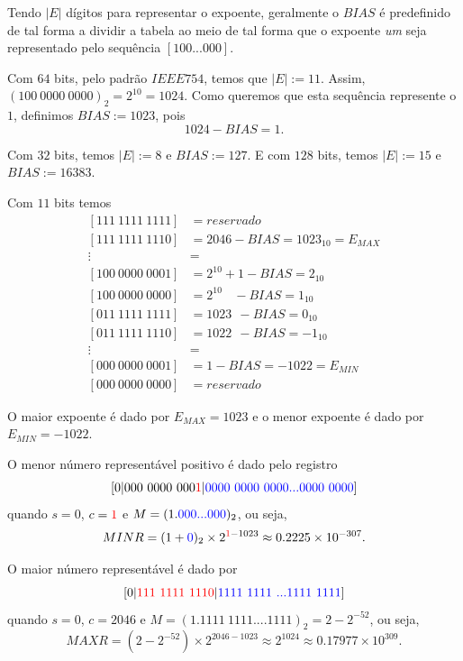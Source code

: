 Tendo $|E|$ dígitos para representar o expoente, geralmente o $BIAS$ é predefinido de tal forma a dividir a tabela ao meio de tal forma que o expoente \textit{um} seja representado pelo sequência $[100...000]$. 

\begin{ex}
Com $64$ bits, pelo padrão $IEEE754$, temos que $|E|:=11$. Assim, $(100~0000~0000)_2=2^{10}=1024$. Como queremos que esta sequência represente o $1$, definimos $BIAS:=1023$, pois
$$ 1024-BIAS=1.$$

Com $32$ bits, temos $|E|:=8$ e $BIAS:=127$. E com $128$ bits, temos $|E|:=15$ e $BIAS:=16383$.
\end{ex}


Com $11$ bits temos 
\begin{equation*}
  \begin{split}
 [111~1111~1111] &= reservado\\
 [111~1111~1110] &= 2046-BIAS      = 1023_{10}= E_{MAX}\\
     \vdots      &=  \\
 [100~0000~0001] &= 2^{10}+1  -BIAS =  2_{10} \\
 [100~0000~0000] &= 2^{10}~~~~-BIAS =  1_{10} \\
 [011~1111~1111] &= 1023   ~~ -BIAS =  0_{10} \\
 [011~1111~1110] &= 1022   ~~ -BIAS = -1_{10} \\
     \vdots      &=  \\
 [000~0000~0001] &= 1-BIAS = -1022 = E_{MIN}\\
 [000~0000~0000] &= reservado    
  \end{split}
\end{equation*}

O maior expoente é dado por $E_{MAX}=1023$ e o menor expoente é dado por $E_{MIN}=-1022$.



O menor número representável positivo é dado pelo registro
$$
[0|000~0000~000{\color{red}{1}} |{\color{blue}{0000~0000~0000...0000~0000}}]
$$
quando $s=0$, $c={\color{red}{1}}$ e $M=(1.{\color{blue}{000...000}})_2$, ou seja,
$$
MINR=(1+{\color{blue}{0}})_2\times 2^{{\color{red}{1}}-1023} \approx 0.2225\times 10^{-307}.
$$

O maior número representável é dado por
$$
[0|{\color{red}{111~1111~1110}} |{\color{blue}{1111~1111~...1111~1111}}]
$$
quando $s=0$, $c=2046$ e $M=(1.1111~1111....1111)_2=2-2^{-52}$, ou seja,
$$
MAXR=(2-2^{-52})\times 2^{2046-1023} \approx 2^{1024}\approx0.17977\times 10^{309}.
$$


